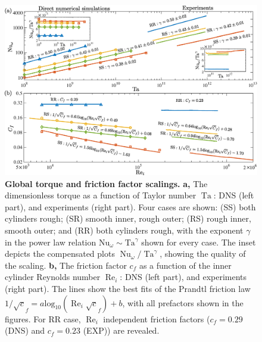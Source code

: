 \documentclass[aps,prl,superscriptaddress,preprint]{revtex4}
\renewcommand{\Re}{\operatorname{Re}}
\newcommand{\Ta}{\operatorname{Ta}}
\newcommand{\Nu}{\operatorname{Nu}_{\omega}}
\begin{document}
\begin{figure}[!h]
\begin{center}
\includegraphics[width=6.4in]{2.eps}
\caption{ 
{\bf Global torque and friction factor scalings.} {\bf a,} The dimensionless torque as a function of Taylor number $\Ta$: DNS (left part), and experiments (right part). Four cases are shown: (SS) both cylinders rough; (SR) smooth inner, rough outer; (RS) rough inner, smooth outer; and (RR) both cylinders rough, with the exponent $\gamma$ in the power law relation $\textrm{Nu}_\omega \sim \mathrm{Ta}^\gamma$ shown for every case. The inset depicts the compensated plots $\Nu/\Ta^\gamma$, showing the quality of the scaling. {\bf b,} The friction factor $c_f$ as a function of the inner cylinder Reynolds number $\Re_i$: DNS (left part), and experiments (right part). The lines show the best fits of the Prandtl friction law $1/\sqrt c_f=a \mathrm{log} _{10}(\Re_i \sqrt c_f)+b$, with all prefactors shown in the figures. For RR case, $\Re_i$ independent friction factors ($c_f=0.29$ (DNS) and $c_f=0.23$ (EXP)) are revealed.
}
\label{fig:fig2}
\end{center}
\end{figure}
\end{document}
